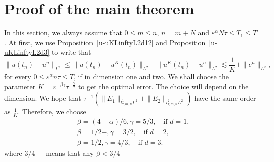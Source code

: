 \documentclass[10pt,a4paper]{article}
\begin{document}
  \section{Proof of the main theorem}
  In this section, we always assume that \(0\leq m\leq n\), \(n=m+N\) and
  \(\varepsilon^\alpha N\tau \leq T_1 \leq T\). 
  At first, we use Proposition~\ref{u-uKLinftyL2d12} and
  Proposition~\ref{u-uKLinftyL2d3} to write that 
  \[ \| u(t_n) - u^n \|_{L^2} \leq \|u(t_n) - u^K(t_n)\|_{L^2} + \|u^K(t_n) - u^n\|_{L^2}
  \lesssim \frac1K + \|e^n\|_{L^2}, \]
  for every \( 0 \leq \varepsilon^\alpha n\tau \leq T\), if in dimension one and
  two.
  We shall choose the parameter \(K = \varepsilon^{-\beta\gamma} \tau^{-\frac\gamma2}\)
  to get the optimal error. The choice will depend on the dimension. 
  We hope that \(\tau^{-1}(\|E_1\|_{l^1_{\tau,m,n} L^2} + \|E_2\|_{l^2_{\tau,m,n} L^2})\)
  have the same order as \(\frac1K\). Therefore, we choose
  \begin{equation}\label{bg}
    \begin{aligned}
      & \beta = (4-\alpha)/6, \gamma = 5/3 ,\quad \text{if } d=1, \\ 
      & \beta = 1/2-, \gamma = 3/2, \quad \text{if } d=2, \\ 
      & \beta = 1/2, \gamma = 4/3, \quad \text{if } d=3. 
    \end{aligned}
  \end{equation}
  where \(3/4-\) means that any \(\beta < 3/4\)
\end{document}
